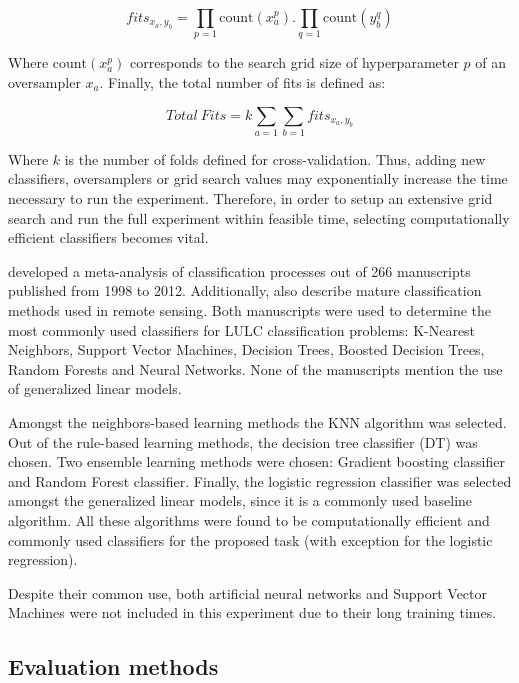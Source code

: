 \documentclass[parskip=full]{scrartcl}
\begin{document}
\begin{equation}
fits_{x_a,y_b}=\prod\limits_{p=1} \textrm{count}(x_a^p).\prod\limits_{q=1}
\textrm{count}(y_b^q)
\end{equation}

Where $\textrm{count}(x_a^p)$ corresponds to the search grid size of
hyperparameter $p$ of an oversampler $x_a$. Finally, the total number of fits is
defined as:

\begin{equation}
Total\ Fits=k\sum\limits_{a=1} \sum\limits_{b=1} fits_{x_a,y_b}
\end{equation}

Where $k$ is the number of folds defined for cross-validation. Thus, adding new
classifiers, oversamplers or grid search values may exponentially increase the
time necessary to run the experiment. Therefore, in order to setup an extensive
grid search and run the full experiment within feasible time, selecting
computationally efficient classifiers becomes vital.

\cite{Khatami2016} developed a meta-analysis of classification processes out of
266 manuscripts published from 1998 to 2012. Additionally, \cite{Maxwell2018}
also describe mature classification methods used in remote sensing. Both
manuscripts were used to determine the most commonly used classifiers for LULC
classification problems: K-Nearest Neighbors, Support Vector Machines, Decision
Trees, Boosted Decision Trees, Random Forests and Neural Networks. None of the
manuscripts mention the use of generalized linear models.

Amongst the neighbors-based learning methods the KNN algorithm was selected. Out
of the rule-based learning methods, the decision tree classifier (DT) was
chosen. Two ensemble learning methods were chosen: Gradient boosting classifier
and Random Forest classifier. Finally, the logistic regression classifier was
selected amongst the generalized linear models, since it is a commonly used
baseline algorithm. All these algorithms were found to be computationally
efficient and commonly used classifiers for the proposed task (with exception
for the logistic regression).

Despite their common use, both artificial neural networks and Support Vector
Machines were not included in this experiment due to their long training times.

\subsection{Evaluation methods} \label{evaluation methods}
\end{document}
